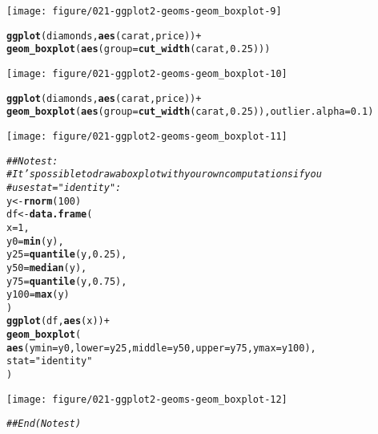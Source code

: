 \documentclass[a4paper,titlepage]{tufte-handout}\usepackage[]{graphicx}\usepackage[]{color}
\makeatletter
\def\maxwidth{ %
  \ifdim\Gin@nat@width>\linewidth
    \linewidth
  \else
    \Gin@nat@width
  \fi
}
\newcommand{\hlnum}[1]{\textcolor[rgb]{0.686,0.059,0.569}{#1}}%
\newcommand{\hlstr}[1]{\textcolor[rgb]{0.192,0.494,0.8}{#1}}%
\newcommand{\hlcom}[1]{\textcolor[rgb]{0.678,0.584,0.686}{\textit{#1}}}%
\newcommand{\hlopt}[1]{\textcolor[rgb]{0,0,0}{#1}}%
\newcommand{\hlstd}[1]{\textcolor[rgb]{0.345,0.345,0.345}{#1}}%
\newcommand{\hlkwb}[1]{\textcolor[rgb]{0.69,0.353,0.396}{#1}}%
\newcommand{\hlkwc}[1]{\textcolor[rgb]{0.333,0.667,0.333}{#1}}%
\newcommand{\hlkwd}[1]{\textcolor[rgb]{0.737,0.353,0.396}{\textbf{#1}}}%
\newenvironment{kframe}{%
 \def\at@end@of@kframe{}%
 \ifinner\ifhmode%
  \def\at@end@of@kframe{\end{minipage}}%
  \begin{minipage}{\columnwidth}%
 \fi\fi%
 \def\FrameCommand##1{\hskip\@totalleftmargin \hskip-\fboxsep
 \colorbox{shadecolor}{##1}\hskip-\fboxsep
     \hskip-\linewidth \hskip-\@totalleftmargin \hskip\columnwidth}%
 \MakeFramed {\advance\hsize-\width
   \@totalleftmargin\z@ \linewidth\hsize
   \@setminipage}}%
 {\par\unskip\endMakeFramed%
 \at@end@of@kframe}
\newenvironment{knitrout}{}{} %
\makeatother
\begin{document}
\begin{knitrout}
\begin{kframe}
{\ttfamily\noindent\color{warningcolor}{\#\# Warning: Continuous x aesthetic -- did you forget aes(group=...)?}}\end{kframe}
\texttt{[image: figure/021-ggplot2-geoms-geom\_boxplot-9]} 
\begin{kframe}\begin{alltt}
\hlkwd{ggplot}\hlstd{(diamonds,} \hlkwd{aes}\hlstd{(carat, price))} \hlopt{+}
  \hlkwd{geom_boxplot}\hlstd{(}\hlkwd{aes}\hlstd{(}\hlkwc{group} \hlstd{=} \hlkwd{cut_width}\hlstd{(carat,} \hlnum{0.25}\hlstd{)))}
\end{alltt}
\end{kframe}
\texttt{[image: figure/021-ggplot2-geoms-geom\_boxplot-10]} 
\begin{kframe}\begin{alltt}
\hlkwd{ggplot}\hlstd{(diamonds,} \hlkwd{aes}\hlstd{(carat, price))} \hlopt{+}
  \hlkwd{geom_boxplot}\hlstd{(}\hlkwd{aes}\hlstd{(}\hlkwc{group} \hlstd{=} \hlkwd{cut_width}\hlstd{(carat,} \hlnum{0.25}\hlstd{)),} \hlkwc{outlier.alpha} \hlstd{=} \hlnum{0.1}\hlstd{)}
\end{alltt}
\end{kframe}
\texttt{[image: figure/021-ggplot2-geoms-geom\_boxplot-11]} 
\begin{kframe}\begin{alltt}
\hlcom{## No test: }
\hlcom{# It's possible to draw a boxplot with your own computations if you}
\hlcom{# use stat = "identity":}
\hlstd{y} \hlkwb{<-} \hlkwd{rnorm}\hlstd{(}\hlnum{100}\hlstd{)}
\hlstd{df} \hlkwb{<-} \hlkwd{data.frame}\hlstd{(}
  \hlkwc{x} \hlstd{=} \hlnum{1}\hlstd{,}
  \hlkwc{y0} \hlstd{=} \hlkwd{min}\hlstd{(y),}
  \hlkwc{y25} \hlstd{=} \hlkwd{quantile}\hlstd{(y,} \hlnum{0.25}\hlstd{),}
  \hlkwc{y50} \hlstd{=} \hlkwd{median}\hlstd{(y),}
  \hlkwc{y75} \hlstd{=} \hlkwd{quantile}\hlstd{(y,} \hlnum{0.75}\hlstd{),}
  \hlkwc{y100} \hlstd{=} \hlkwd{max}\hlstd{(y)}
\hlstd{)}
\hlkwd{ggplot}\hlstd{(df,} \hlkwd{aes}\hlstd{(x))} \hlopt{+}
  \hlkwd{geom_boxplot}\hlstd{(}
   \hlkwd{aes}\hlstd{(}\hlkwc{ymin} \hlstd{= y0,} \hlkwc{lower} \hlstd{= y25,} \hlkwc{middle} \hlstd{= y50,} \hlkwc{upper} \hlstd{= y75,} \hlkwc{ymax} \hlstd{= y100),}
   \hlkwc{stat} \hlstd{=} \hlstr{"identity"}
 \hlstd{)}
\end{alltt}
\end{kframe}
\texttt{[image: figure/021-ggplot2-geoms-geom\_boxplot-12]} 
\begin{kframe}\begin{alltt}
\hlcom{## End(No test)}
\end{alltt}
\end{kframe}
\end{knitrout}
\end{document}
